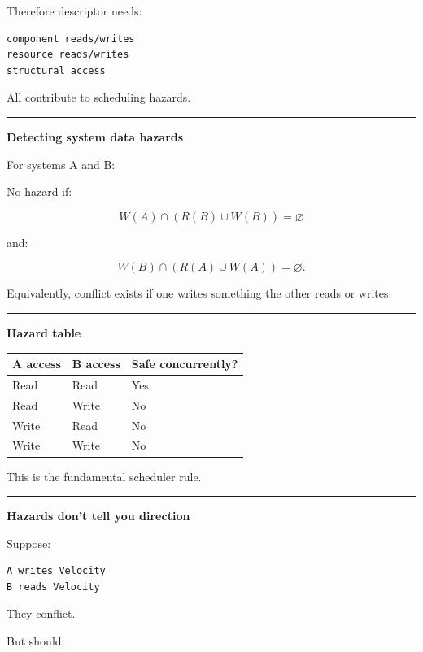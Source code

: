 Therefore descriptor needs:

\begin{verbatim}
component reads/writes
resource reads/writes
structural access
\end{verbatim}

All contribute to scheduling hazards.

\begin{center}\rule{0.5\linewidth}{0.5pt}\end{center}

\textbf{Detecting system data hazards}

For systems A and B:

No hazard if:

\[
W(A)\cap
(R(B)\cup W(B))
=
\varnothing
\]

and:

\[
W(B)\cap
(R(A)\cup W(A))
=
\varnothing.
\]

Equivalently, conflict exists if one writes something the other reads or writes.

\begin{center}\rule{0.5\linewidth}{0.5pt}\end{center}

\textbf{Hazard table}

{\def\LTcaptype{none} %
\begin{longtable}[]{@{}lll@{}}
\toprule\noalign{}
A access & B access & Safe concurrently? \\
\midrule\noalign{}
\endhead
\bottomrule\noalign{}
\endlastfoot
Read & Read & Yes \\
Read & Write & No \\
Write & Read & No \\
Write & Write & No \\
\end{longtable}
}

This is the fundamental scheduler rule.

\begin{center}\rule{0.5\linewidth}{0.5pt}\end{center}

\textbf{Hazards don't tell you direction}

Suppose:

\begin{verbatim}
A writes Velocity
B reads Velocity
\end{verbatim}

They conflict.

But should:

